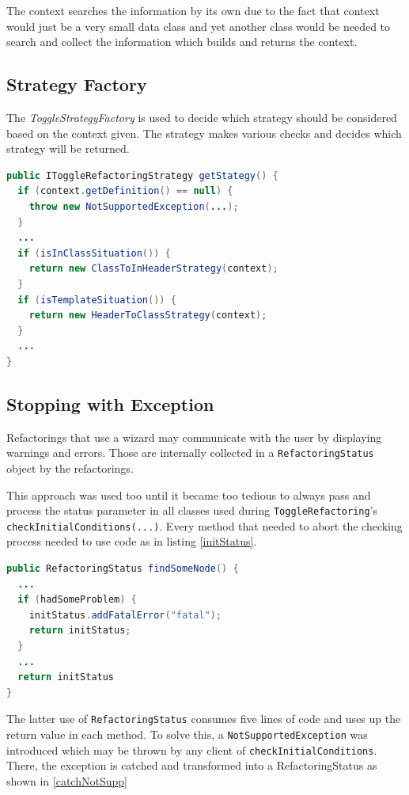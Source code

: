The context searches the information by its own due
to the fact that context would just be a very small data class and yet another
class would be needed to search and collect the information which builds and
returns the context.

\subsection{Strategy Factory}
\label{factory}

The \textit{ToggleStrategyFactory} is used to decide which strategy should be 
considered based on the context given. The strategy makes various checks
and decides which strategy will be returned.

\begin{lstlisting}[caption={IToggleRefactoringStrategy},
label={strategy}, language=Java]
public IToggleRefactoringStrategy getStategy() {
  if (context.getDefinition() == null) {
    throw new NotSupportedException(...);
  }
  ...
  if (isInClassSituation()) {
    return new ClassToInHeaderStrategy(context);
  }
  if (isTemplateSituation()) {
    return new HeaderToClassStrategy(context);
  }
  ...
}
\end{lstlisting}

\subsection{Stopping with Exception}
Refactorings that use a wizard may communicate with the user by displaying 
warnings and errors. Those are internally collected in a 
\texttt{RefactoringStatus} object by the refactorings.

This approach was used too until it became too tedious to always pass and 
process the status parameter in all classes used during 
\texttt{ToggleRefactoring}'s \texttt{checkInitialConditions(...)}.
Every method that needed to abort the checking process needed to use code as 
in listing \ref{initStatus}.

\begin{lstlisting}[caption={Exemplary use of the RefactoringStatus},
label={initStatus}, language=Java]
public RefactoringStatus findSomeNode() {
  ...
  if (hadSomeProblem) {
    initStatus.addFatalError("fatal");
    return initStatus;
  }
  ...
  return initStatus
}
\end{lstlisting}

The latter use of \texttt{RefactoringStatus} consumes five lines of code and 
uses up the return value in each method. To solve this, a 
\texttt{NotSupportedException} was introduced which may be thrown by any client 
of \texttt{checkInitialConditions}. There, the exception is catched and 
transformed into a RefactoringStatus as shown in \ref{catchNotSupp}

